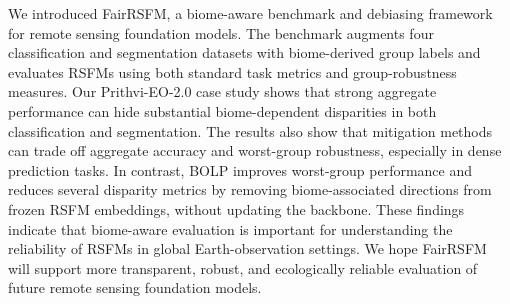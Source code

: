 \documentclass[10pt,twocolumn,letterpaper]{article}
\newcommand{\method}{FairRSFM\xspace}
\begin{document}
We introduced \method, a biome-aware benchmark and debiasing framework for remote sensing foundation models. The benchmark augments four classification and segmentation datasets with biome-derived group labels and evaluates RSFMs using both standard task metrics and group-robustness measures. Our Prithvi-EO-2.0 case study shows that strong aggregate performance can hide substantial biome-dependent disparities in both classification and segmentation. The results also show that mitigation methods can trade off aggregate accuracy and worst-group robustness, especially in dense prediction tasks. In contrast, BOLP improves worst-group performance and reduces several disparity metrics by removing biome-associated directions from frozen RSFM embeddings, without updating the backbone. These findings indicate that biome-aware evaluation is important for understanding the reliability of RSFMs in global Earth-observation settings. We hope \method will support more transparent, robust, and ecologically reliable evaluation of future remote sensing foundation models.

\clearpage

{\small


}
\end{document}
